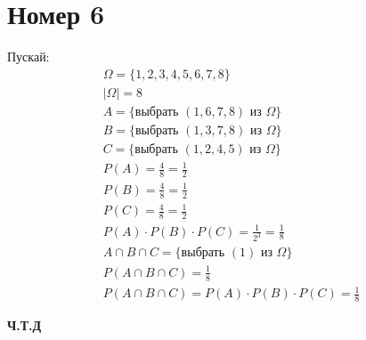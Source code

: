 \section*{Номер 6}
Пускай:
\begin{equation*}
\begin{gathered}
\Omega = \{1, 2, 3, 4, 5, 6, 7, 8\} \\ 
|\Omega| = 8 \\
A  = \{\text{выбрать } (1, 6, 7, 8) \text{ из } \Omega \} \\
B = \{\text{выбрать } (1, 3, 7, 8) \text{ из } \Omega \} \\
C =  \{\text{выбрать } (1, 2, 4, 5) \text{ из } \Omega \} \\
P(A) = \frac{4}{8} = \frac{1}{2} \\
P(B) = \frac{4}{8} = \frac{1}{2}  \\
P(C) = \frac{4}{8} = \frac{1}{2}  \\
P(A) \cdot P(B) \cdot P(C) = \frac{1}{2^3} = \frac{1}{8} \\
A \cap B \cap C = \{\text{выбрать } (1) \text{ из } \Omega \} \\
P(A \cap B \cap C) = \frac{1}{8} \\
P(A \cap B \cap C) = P(A) \cdot P(B) \cdot P(C) = \frac{1}{8}
\end{gathered}
\end{equation*}
\begin{center}
\textbf{Ч.Т.Д}
\end{center}
 
